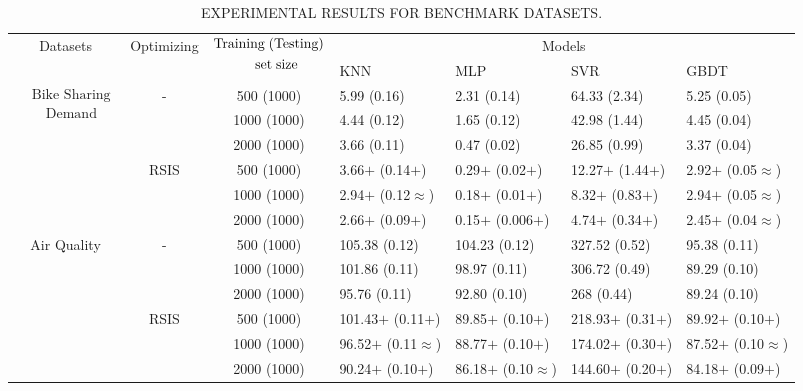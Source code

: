 \documentclass[lettersize,journal]{IEEEtran}
\begin{document}
\begin{table}[!t]
  \caption{EXPERIMENTAL RESULTS FOR BENCHMARK DATASETS.}\label{tab4}
  \begin{tabularx}{\textwidth}{cccXXXX}
  \toprule
  \multirow{2}{*}{Datasets} & \multirow{2}{*}{Optimizing} & \multirow{2}{*}{$\begin{aligned}&\text{Training\;(Testing)}\\&\qquad\quad\text{set\;size}\end{aligned}$} & \multicolumn{4}{c}{Models} \\ 
  \cmidrule{4-7}
    &  &  & KNN & MLP & SVR & GBDT \\
  \cmidrule{1-7}
  \multirow{6}{*}{$\begin{aligned}&\text{Bike Sharing}\\&\quad\text{Demand}\end{aligned}$} & \multirow{3}{*}{-} & 500 (1000) & 5.99 (0.16) & 2.31 (0.14) & 64.33 (2.34) & 5.25 (0.05) \\
    &  & 1000 (1000) & 4.44 (0.12) & 1.65 (0.12) & 42.98 (1.44) & 4.45 (0.04) \\
    &  & 2000 (1000) & 3.66 (0.11) & 0.47 (0.02) & 26.85 (0.99) & 3.37 (0.04) \\
  \cmidrule{2-7}
    & \multirow{3}{*}{RSIS} & 500 (1000) & 3.66$+$ (0.14$+$) & 0.29$+$ (0.02$+$) & 12.27$+$ (1.44$+$) & 2.92$+$ (0.05$\approx$) \\
    &  & 1000 (1000) & 2.94$+$ (0.12$\approx$) & 0.18$+$ (0.01$+$) & 8.32$+$ (0.83$+$) & 2.94$+$ (0.05$\approx$) \\
    &  & 2000 (1000) & 2.66$+$ (0.09$+$) & 0.15$+$ (0.006$+$) & 4.74$+$ (0.34$+$) & 2.45$+$ (0.04$\approx$) \\
  \cmidrule{1-7}
  \multirow{6}{*}{Air Quality} & \multirow{3}{*}{-} & 500 (1000) & 105.38 (0.12) & 104.23 (0.12) & 327.52 (0.52) & 95.38 (0.11) \\
    &  & 1000 (1000) & 101.86 (0.11) & 98.97 (0.11) & 306.72 (0.49) & 89.29 (0.10) \\
    &  & 2000 (1000) & 95.76 (0.11) & 92.80 (0.10) & 268 (0.44) & 89.24 (0.10) \\
  \cmidrule{2-7}
    & \multirow{3}{*}{RSIS} & 500 (1000) & 101.43$+$ (0.11$+$) & 89.85$+$ (0.10$+$) & 218.93$+$ (0.31$+$) & 89.92$+$ (0.10$+$) \\
    &  & 1000 (1000) & 96.52$+$ (0.11$\approx$) & 88.77$+$ (0.10$+$) & 174.02$+$ (0.30$+$) & 87.52$+$ (0.10$\approx$) \\
    &  & 2000 (1000) & 90.24$+$ (0.10$+$) & 86.18$+$ (0.10$\approx$) & 144.60$+$ (0.20$+$) & 84.18$+$ (0.09$+$) \\

\end{tabularx}
\end{table}
\end{document}

